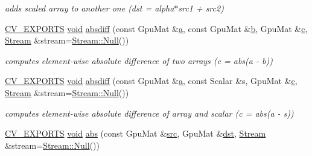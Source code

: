 \begin{DoxyCompactItemize}
\begin{DoxyCompactList}\small\item\em adds scaled array to another one (dst = alpha$\ast$src1 + src2) \end{DoxyCompactList}\item 
\hyperlink{core_2types__c_8h_a1bf9f0e121b54272da02379cfccd0a2b}{C\-V\-\_\-\-E\-X\-P\-O\-R\-T\-S} \hyperlink{legacy_8hpp_a8bb47f092d473522721002c86c13b94e}{void} \hyperlink{namespacecv_1_1gpu_ac9278c63dd1bd27f4ebe5e965b361cb4}{absdiff} (const Gpu\-Mat \&\hyperlink{legacy_8hpp_a1031d0e0a97a340abfe0a6ab9e831045}{a}, const Gpu\-Mat \&\hyperlink{legacy_8hpp_ac04272e8ca865b8fba18d36edae9fd2a}{b}, Gpu\-Mat \&\hyperlink{legacy_8hpp_a1971420173e06f45845eed2ab4e3d5d0}{c}, \hyperlink{classcv_1_1gpu_1_1Stream}{Stream} \&stream=\hyperlink{classcv_1_1gpu_1_1Stream_af96c23564834f88333dcb8997df553f1}{Stream\-::\-Null}())
\begin{DoxyCompactList}\small\item\em computes element-\/wise absolute difference of two arrays (c = abs(a -\/ b)) \end{DoxyCompactList}\item 
\hyperlink{core_2types__c_8h_a1bf9f0e121b54272da02379cfccd0a2b}{C\-V\-\_\-\-E\-X\-P\-O\-R\-T\-S} \hyperlink{legacy_8hpp_a8bb47f092d473522721002c86c13b94e}{void} \hyperlink{namespacecv_1_1gpu_a7e55928098c0f834e0e258acd38cb5ab}{absdiff} (const Gpu\-Mat \&\hyperlink{legacy_8hpp_a1031d0e0a97a340abfe0a6ab9e831045}{a}, const Scalar \&s, Gpu\-Mat \&\hyperlink{legacy_8hpp_a1971420173e06f45845eed2ab4e3d5d0}{c}, \hyperlink{classcv_1_1gpu_1_1Stream}{Stream} \&stream=\hyperlink{classcv_1_1gpu_1_1Stream_af96c23564834f88333dcb8997df553f1}{Stream\-::\-Null}())
\begin{DoxyCompactList}\small\item\em computes element-\/wise absolute difference of array and scalar (c = abs(a -\/ s)) \end{DoxyCompactList}\item 
\hyperlink{core_2types__c_8h_a1bf9f0e121b54272da02379cfccd0a2b}{C\-V\-\_\-\-E\-X\-P\-O\-R\-T\-S} \hyperlink{legacy_8hpp_a8bb47f092d473522721002c86c13b94e}{void} \hyperlink{namespacecv_1_1gpu_ad5b2b7dea0c16819ab3f7f3c2e8ca75b}{abs} (const Gpu\-Mat \&\hyperlink{legacy_8hpp_a371cd109b74033bc4366f584edd3dacc}{src}, Gpu\-Mat \&\hyperlink{photo__c_8h_aed13e2a25279b24dc954073233fef7a5}{dst}, \hyperlink{classcv_1_1gpu_1_1Stream}{Stream} \&stream=\hyperlink{classcv_1_1gpu_1_1Stream_af96c23564834f88333dcb8997df553f1}{Stream\-::\-Null}())

\end{DoxyCompactItemize}
